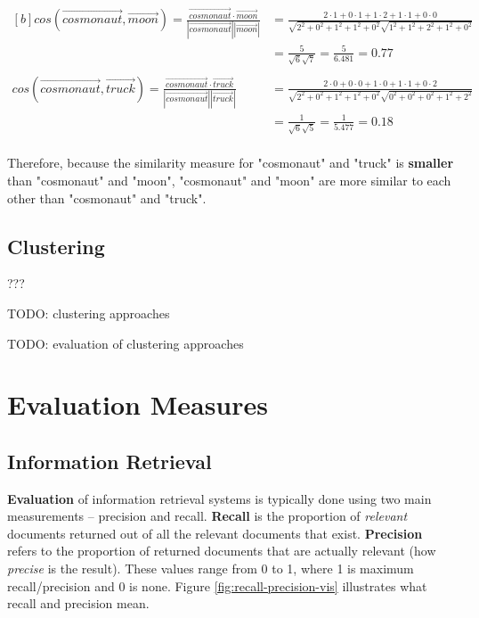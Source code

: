 \documentclass{article}
\begin{document}
\begin{equation}
\begin{aligned}[b]
	cos(\vec{cosmonaut}, \vec{moon}) = 
	\frac{\vec{cosmonaut} \cdot \vec{moon}}{|\vec{cosmonaut}| |\vec{moon}|}
	&= \frac{2 \cdot 1 + 0 \cdot 1 + 1 \cdot 2 + 1 \cdot 1 + 0 \cdot 0}{ \sqrt{2^2 + 0^2 + 1^2 + 1^2 + 0^2} \sqrt{1^2 + 1^2 + 2^2 + 1^2 + 0^2} } \\
	&= \frac{5}{\sqrt{6}\sqrt{7}} = \frac{5}{6.481} = 0.77 \\
	\\
	cos(\vec{cosmonaut}, \vec{truck}) = 
	\frac{\vec{cosmonaut} \cdot \vec{truck}}{|\vec{cosmonaut}| |\vec{truck}|}
	&= \frac{2 \cdot 0 + 0 \cdot 0 + 1 \cdot 0 + 1 \cdot 1 + 0 \cdot 2}{ \sqrt{2^2 + 0^2 + 1^2 + 1^2 + 0^2} \sqrt{0^2 + 0^2 + 0^2 + 1^2 + 2^2} } \\
	&= \frac{1}{\sqrt{6}\sqrt{5}} = \frac{1}{5.477} = 0.18 \\
	\label{eq:similarity-measure-example}
\end{aligned}
\end{equation}

Therefore, because the similarity measure for "cosmonaut" and "truck" is \textbf{smaller} than "cosmonaut" and "moon", "cosmonaut" and "moon" are more similar to each other than "cosmonaut" and "truck". 

\subsection{Clustering}

???

TODO: clustering approaches

TODO: evaluation of clustering approaches

\section{Evaluation Measures}

\subsection{Information Retrieval}
\label{sec:ir-evaluation}

\textbf{Evaluation} of information retrieval systems is typically done using two main measurements -- precision and recall. \textbf{Recall} is the proportion of \textit{relevant} documents returned out of all the relevant documents that exist. \textbf{Precision} refers to the proportion of returned documents that are actually relevant (how \textit{precise} is the result). These values range from 0 to 1, where 1 is maximum recall/precision and 0 is none. Figure \ref{fig:recall-precision-vis} illustrates what recall and precision mean.
\end{document}
